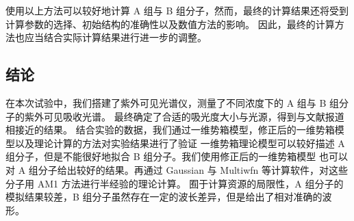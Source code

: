 \documentclass[cn,hazy,pku,12pt,normal,math=newtx,cite=super]{elegantnote}
\begin{document}
使用以上方法可以较好地计算 A 组与 B 组分子，然而，最终的计算结果还将受到计算参数的选择、初始结构的准确性以及数值方法的影响。
因此，最终的计算方法也应当结合实际计算结果进行进一步的调整。





\subsection{结论}

在本次试验中，我们搭建了紫外可见光谱仪，测量了不同浓度下的 A 组与 B 组分子的紫外可见吸收光谱。
最终确定了合适的吸光度大小与光源，得到与文献报道相接近的结果。
结合实验的数据，我们通过一维势箱模型，修正后的一维势箱模型以及理论计算的方法对实验结果进行了验证
一维势箱理论模型可以较好描述 A 组分子，但是不能很好地拟合 B 组分子。我们使用修正后的一维势箱模型
也可以对 A 组分子给出较好的结果。再通过 Gaussian 与 Multiwfn 等计算软件，对这些分子用 AM1 方法进行半经验的理论计算。
囿于计算资源的局限性，A 组分子的模拟结果较差，B 组分子虽然存在一定的波长差异，但是给出了相对准确的波形。


\nocite{*}

\end{document}
